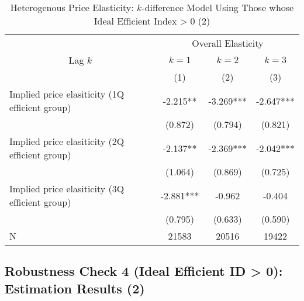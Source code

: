 \documentclass[ review  , 3p ]{elsarticle}
\begin{document}
  \begin{table}
  
  \caption{\label{tab:kableSubsetHeterokDiffElasticitySlide2}Heterogenous Price Elasticity: $k$-difference Model Using Those whose Ideal Efficient Index > 0 (2)}
  \centering
  \fontsize{8}{10}\selectfont
  \begin{tabular}[t]{lccc}
  \toprule
  \multicolumn{1}{c}{ } & \multicolumn{3}{c}{Overall Elasticity} \\
  \cmidrule(l{3pt}r{3pt}){2-4}
  \multicolumn{1}{c}{Lag $k$} & \multicolumn{1}{c}{$k = 1$} & \multicolumn{1}{c}{$k = 2$} & \multicolumn{1}{c}{$k = 3$} \\
  \cmidrule(l{3pt}r{3pt}){1-1} \cmidrule(l{3pt}r{3pt}){2-2} \cmidrule(l{3pt}r{3pt}){3-3} \cmidrule(l{3pt}r{3pt}){4-4}
   & (1) & (2) & (3)\\
  \midrule
  Implied price elasiticity (1Q efficient group) & -2.215** & -3.269*** & -2.647***\\
   & (0.872) & (0.794) & (0.821)\\
  Implied price elasiticity (2Q efficient group) & -2.137** & -2.369*** & -2.042***\\
   & (1.064) & (0.869) & (0.725)\\
  Implied price elasiticity (3Q efficient group) & -2.881*** & -0.962 & -0.404\\
   & (0.795) & (0.633) & (0.590)\\
  N & 21583 & 20516 & 19422\\
  \bottomrule
  \end{tabular}
  \end{table}
  
  \hypertarget{robustness-check-4-ideal-efficient-id-0-estimation-results-2}{%
  \subsection{Robustness Check 4 (Ideal Efficient ID \textgreater{} 0): Estimation Results (2)}\label{robustness-check-4-ideal-efficient-id-0-estimation-results-2}}
  
\end{document}
